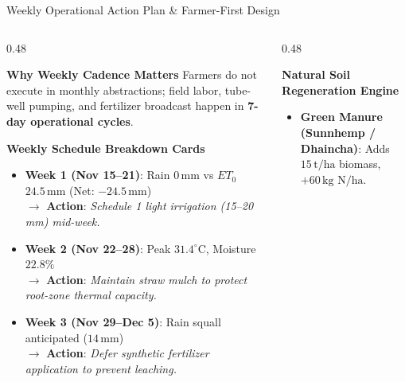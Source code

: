 \documentclass[aspectratio=169,10pt]{beamer}
\begin{document}
\begin{frame}{Weekly Operational Action Plan \& Farmer-First Design}
    \begin{columns}[T]
        \begin{column}{0.48\textwidth}
            \begin{block}{\textbf{Why Weekly Cadence Matters}}
                \footnotesize
                Farmers do not execute in monthly abstractions; field labor, tube-well pumping, and fertilizer broadcast happen in \textbf{7-day operational cycles}.
            \end{block}
            \vspace{0.2cm}
            \begin{exampleblock}{\textbf{Weekly Schedule Breakdown Cards}}
                \scriptsize
                \begin{itemize}
                    \item \textbf{Week 1 (Nov 15--21)}: Rain $0\,\text{mm}$ vs $ET_0$ $24.5\,\text{mm}$ (Net: $-24.5\,\text{mm}$) \\
                    $\rightarrow$ \textbf{Action}: \textit{Schedule 1 light irrigation (15--20 mm) mid-week.}
                    \item \textbf{Week 2 (Nov 22--28)}: Peak $31.4^\circ\text{C}$, Moisture $22.8\%$ \\
                    $\rightarrow$ \textbf{Action}: \textit{Maintain straw mulch to protect root-zone thermal capacity.}
                    \item \textbf{Week 3 (Nov 29--Dec 5)}: Rain squall anticipated ($14\,\text{mm}$) \\
                    $\rightarrow$ \textbf{Action}: \textit{Defer synthetic fertilizer application to prevent leaching.}
                \end{itemize}
            \end{exampleblock}
        \end{column}
        \begin{column}{0.48\textwidth}
            \begin{block}{\textbf{Natural Soil Regeneration Engine}}
                \footnotesize
                \begin{itemize}
                    \item \textbf{Green Manure (Sunnhemp / Dhaincha)}: Adds $15\,\text{t/ha}$ biomass, $+60\,\text{kg N/ha}$.

\end{itemize}
\end{block}
\end{column}
\end{columns}
\end{frame}
\end{document}

